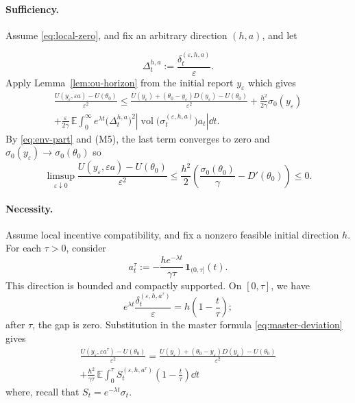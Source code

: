 \documentclass[12pt]{article}
\DeclareMathOperator{\vol}{vol}
\begin{document}
\paragraph{Sufficiency.}
Assume \eqref{eq:local-zero}, and fix an arbitrary direction \((h,a)\), and let 

\[
  \Delta_t^{h,a}:=\frac{\delta_t^{(\varepsilon,h,a)}}{\varepsilon}.
\]
Apply Lemma~\ref{lem:ou-horizon} from the initial report
\(y_\varepsilon\) which gives
\begin{multline*}
\frac{U(y_\varepsilon,\varepsilon a)-U(\theta_0)}{\varepsilon^2}
\le
\frac{U(y_\varepsilon)+(\theta_0-y_\varepsilon)D(y_\varepsilon)
      -U(\theta_0)}{\varepsilon^2}
+\frac{h^2}{2\gamma}\sigma_0(y_\varepsilon)\\
+\frac{\varepsilon}{2\gamma}\,
 \mathbb E\int_0^\infty e^{\lambda t}
 \big(\Delta_t^{h,a}\big)^2
 \left|\vol\big(\sigma_t^{(\varepsilon,h,a)}\big)a_t\right|\dd t .
\end{multline*}
By \eqref{eq:env-part} and (M5), the last term converges to zero and
\(\sigma_0(y_\varepsilon)\to\sigma_0(\theta_0)\) so 
\[
  \limsup_{\varepsilon\downarrow0}
  \frac{U(y_\varepsilon,\varepsilon a)-U(\theta_0)}{\varepsilon^2}
  \le
  \frac{h^2}{2}
  \left(\frac{\sigma_0(\theta_0)}{\gamma}-D'(\theta_0)\right)
  \le0 .
\]

\paragraph{Necessity.}
Assume local incentive compatibility, and fix a nonzero feasible initial
direction \(h\). For each \(\tau>0\), consider 
\[
  a_t^\tau
  :=-\frac{h e^{-\lambda t}}{\gamma\tau}\,
    \mathbf 1_{(0,\tau]}(t).
\]
This direction is bounded and compactly supported. On \([0,\tau]\), we have
\[
  e^{\lambda t}
  \frac{\delta_t^{(\varepsilon,h,a^\tau)}}{\varepsilon}
  =h\left(1-\frac{t}{\tau}\right);
\]
after \(\tau\), the gap is zero. Substitution in the master formula
\eqref{eq:master-deviation} gives
\begin{multline}\label{eq:ou-ramp}
\frac{U(y_\varepsilon,\varepsilon a^\tau)-U(\theta_0)}
     {\varepsilon^2}
=
\frac{U(y_\varepsilon)+(\theta_0-y_\varepsilon)D(y_\varepsilon)
      -U(\theta_0)}{\varepsilon^2}\\
+\frac{h^2}{\gamma\tau}\,
  \mathbb E\int_0^\tau
  S_t^{(\varepsilon,h,a^\tau)}
  \left(1-\frac{t}{\tau}\right)\dd t 
\end{multline}
where, recall that \(S_t=e^{-\lambda t}\sigma_t\).
\end{document}
